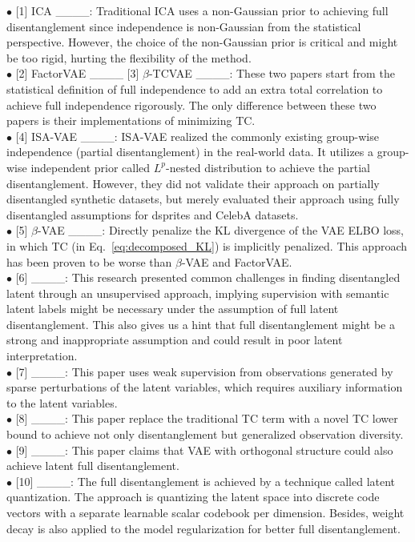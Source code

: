 $\bullet$ [1] ICA ____: Traditional ICA uses a non-Gaussian prior to achieving full disentanglement since independence is non-Gaussian from the statistical perspective. However, the choice of the non-Gaussian prior is critical and might be too rigid, hurting the flexibility of the method. \\
$\bullet$ [2] FactorVAE ____ [3] $\beta$-TCVAE ____: These two papers start from the statistical definition of full independence to add an extra total correlation to achieve full independence rigorously. The only difference between these two papers is their implementations of minimizing TC. \\
$\bullet$ [4] ISA-VAE ____: ISA-VAE realized the commonly existing group-wise independence (partial disentanglement) in the real-world data. It utilizes a group-wise independent prior called $L^p$-nested distribution to achieve the partial disentanglement. However, they did not validate their approach on partially disentangled synthetic datasets, but merely evaluated their approach using fully disentangled assumptions for dsprites and CelebA datasets. \\
$\bullet$ [5] $\beta$-VAE ____: Directly penalize the KL divergence of the VAE ELBO loss, in which TC (in Eq.~\eqref{eq:decomposed_KL}) is implicitly penalized. This approach has been proven to be worse than $\beta$-VAE and FactorVAE. \\
$\bullet$ [6] ____: This research presented common challenges in finding disentangled latent through an unsupervised approach, implying supervision with semantic latent labels might be necessary under the assumption of full latent disentanglement. This also gives us a hint that full disentanglement might be a strong and inappropriate assumption and could result in poor latent interpretation. \\
$\bullet$ [7] ____: This paper uses weak supervision from observations generated by sparse perturbations of the latent variables, which requires auxiliary information to the latent variables. \\
$\bullet$ [8] ____: This paper replace the traditional TC term with a novel TC lower bound to achieve not only disentanglement but generalized observation diversity. \\
$\bullet$ [9] ____: This paper claims that VAE with orthogonal structure could also achieve latent full disentanglement. \\
$\bullet$ [10] ____: The full disentanglement is achieved by a technique called latent quantization. The approach is quantizing the latent space into discrete code vectors with a separate learnable scalar codebook per dimension. Besides, weight decay is also applied to the model regularization for better full disentanglement.

\clearpage